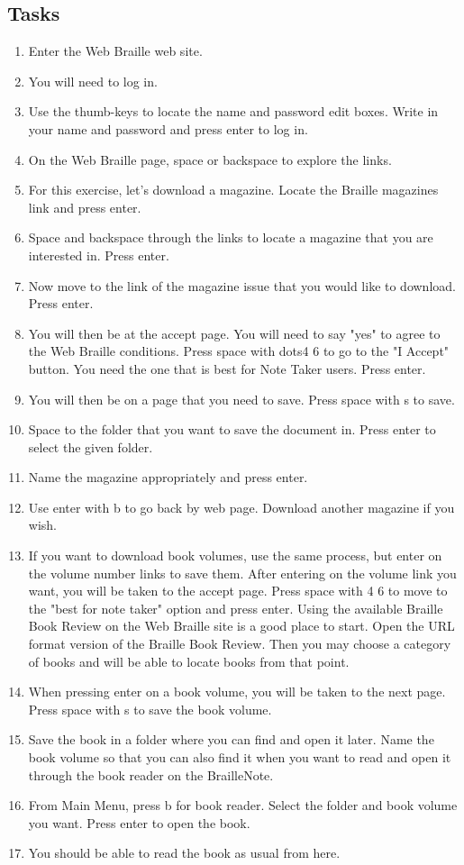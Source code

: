 \documentclass[10pt,letterpaper,twoside]{report}
\begin{document}
{{{\subsection{Tasks}
\begin{enumerate}
	\item Enter the Web Braille web site.
	\item You will need to log in.
	\item Use the thumb-keys to locate the name and password edit boxes.  Write in your name and password and press enter to log in.
	\item On the Web Braille page, space or backspace to explore the links.
	\item For this exercise, let's download a magazine.  Locate the Braille magazines link and press enter.
	\item Space and backspace through the links to locate a magazine that you are interested in.  Press enter.
	\item Now move to the link of the magazine issue that you would like to download.  Press enter.
	\item You will then be at the accept page.  You will need to say "yes" to agree to the Web Braille conditions.  Press space with dots4 6 to go to the "I Accept" button.  You need the one that is best for Note Taker users.  Press enter.
	\item You will then be on a page that you need to save.  Press space with s to save.
	\item Space to the folder that you want to save the document in.  Press enter to select the given folder.
	\item Name the magazine appropriately and press enter.
	\item Use enter with b to go back by web page.  Download another magazine if you wish.
	\item If you want to download book volumes, use the same process, but enter on the volume number links to save them.  After entering on the volume link you want, you will be taken to the accept page.  Press space with 4 6 to move to the "best for note taker" option and press enter.  Using the available Braille Book Review on the Web Braille site is a good place to start.  Open the URL format version of the Braille Book Review.  Then you may choose a category of books and will be able to locate books from that point.
	\item When pressing enter on a book volume, you will be taken to the next page.  Press space with s to save the book volume.
	\item Save the book in a folder where you can find and open it later.  Name the book volume so that you can also find it when you want to read and open it through the book reader on the BrailleNote.
	\item From Main Menu, press b for book reader.  Select the folder and book volume you want.  Press enter to open the book.
	\item You should be able to read the book as usual from here.
\end{enumerate}
\clearpage
}}}
\end{document}
